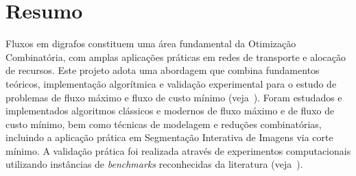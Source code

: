 \section{Resumo}\label{sec:resumo}

Fluxos em digrafos constituem uma área fundamental da Otimização Combinatória, com amplas aplicações práticas em redes de transporte e alocação de recursos. Este projeto adota uma abordagem que combina fundamentos teóricos, implementação algorítmica e validação experimental para o estudo de problemas de fluxo máximo e fluxo de custo mínimo (veja~\cite{ahuja1993network}). Foram estudados e implementados algoritmos clássicos e modernos de fluxo máximo e de fluxo de custo mínimo, bem como técnicas de modelagem e reduções combinatórias, incluindo a aplicação prática em Segmentação Interativa de Imagens via corte mínimo. A validação prática foi realizada através de experimentos computacionais utilizando instâncias de \textit{benchmarks} reconhecidas da literatura (veja~\cite{Jensen2022}).
